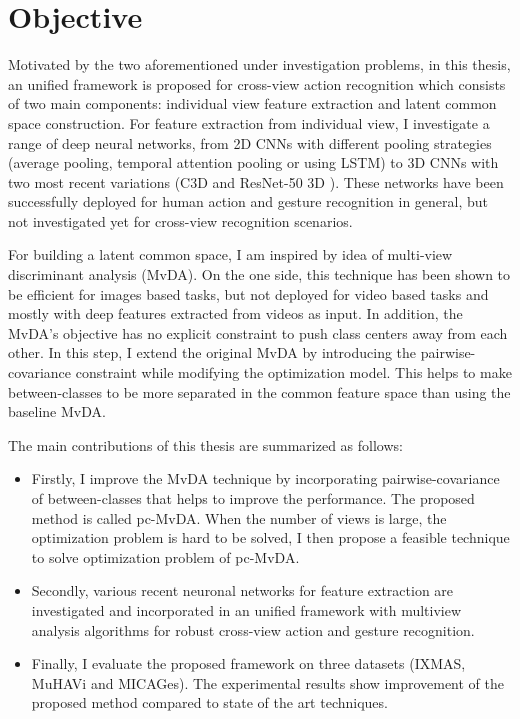     \section{Objective} \label{sec:intro_objective}
        Motivated by the two aforementioned under investigation problems, in this thesis, an unified framework is proposed for cross-view action recognition which consists of two main components: individual view feature extraction and latent common space construction.
        For feature extraction from individual view, I investigate a range of deep neural networks, from 2D CNNs with different pooling strategies (average pooling, temporal attention pooling or using LSTM) to 3D CNNs with two most recent variations (C3D \cite{tran2015learning} and ResNet-50 3D \cite{hara2018can}).
        These networks have been successfully deployed for human action and gesture recognition in general, but not investigated yet for cross-view recognition scenarios.

        For building a latent common space, I am inspired by idea of multi-view discriminant analysis (MvDA).
        On the one side, this technique has been shown to be efficient for images based tasks, but not deployed for video based tasks and mostly with deep features extracted from videos as input.
        In addition, the MvDA's objective has no explicit constraint to push class centers away from each other.
        In this step, I extend the original MvDA by introducing the pairwise-covariance constraint while modifying the optimization model.
        This helps to make between-classes to be more separated in the common feature space than using the baseline MvDA.

        The main contributions of this thesis are summarized as follows: 
        \begin{itemize}
            \item Firstly, I improve the MvDA technique by incorporating pairwise-covariance of between-classes that helps to improve the performance. The proposed method is called pc-MvDA. When the number of views is large, the optimization problem is hard to be solved, I then propose a feasible technique to solve optimization problem of pc-MvDA.
            \item Secondly, various recent neuronal networks for feature extraction are investigated and incorporated in an unified framework with multiview analysis algorithms for robust cross-view action and gesture recognition.
            \item Finally, I evaluate the proposed framework on three datasets (IXMAS, MuHAVi and MICAGes). The experimental results show improvement of the proposed method compared to state of the art techniques.
        \end{itemize}


